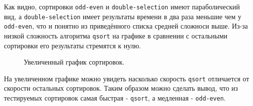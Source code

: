 Как видно, сортировки \texttt{odd-even} и \texttt{double-selection} имеют параболический вид, 
а \texttt{double-selection} имеет результаты времени в два раза меньшие чем у \texttt{odd-even},
что и понятно из приведённого списка средней сложноси выше. Из-за низкой сложность алгоритма \texttt{qsort}
на графике в сравнении с остальными сортировки его результаты стремятся к нулю.

\begin{figure}[H]
    \centering
    \caption{Увеличенный график сортировок.}
\end{figure}

На увеличенном графике можно увидеть насколько скорость \texttt{qsort} отличается от скорости
остальных сортировок. Таким образом можно сделать вывод, что из тестируемых сортировок
самая быстрая - \texttt{qsort}, а медленная - \texttt{odd-even}.

